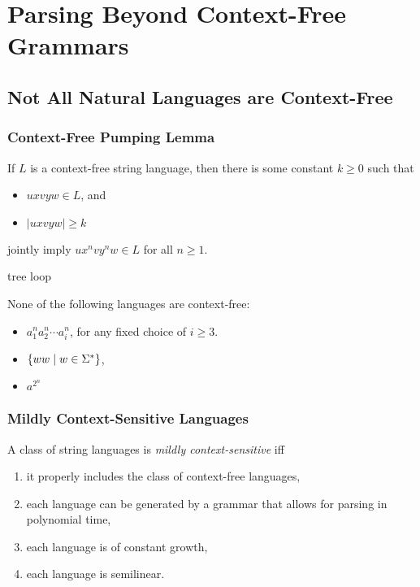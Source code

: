 \chapter{Parsing Beyond Context-Free Grammars}
\label{cha:BeyondCFG}

\section{Not All Natural Languages are Context-Free}

\subsection{Context-Free Pumping Lemma}

\begin{theorem}
    If $L$ is a context-free string language, then there is some constant $k \geq 0$ such that
    \begin{itemize}
        \item $uxvyw \in L$, and
        \item $|uxvyw| \geq k$
    \end{itemize}
    jointly imply $u x^n v y^n w \in L$ for all $n \geq 1$.
\end{theorem}
%
tree loop
%
\begin{lemma}
    None of the following languages are context-free:
    \begin{itemize}
        \item $a_1^n a_2^n \cdots a_i^n$, for any fixed choice of $i \geq 3$.
        \item $\left \{ ww \mid w \in \Sigma^* \right \}$,
        \item $a^{2^n}$
    \end{itemize}
\end{lemma}

\subsection{Mildly Context-Sensitive Languages}

\begin{definition}
    A class of string languages is \emph{mildly context-sensitive} iff
    \begin{enumerate}
        \item it properly includes the class of context-free languages,
        \item each language can be generated by a grammar that allows for parsing in polynomial time,
        \item each language is of constant growth,
        \item each language is semilinear.
    \end{enumerate}
\end{definition}

